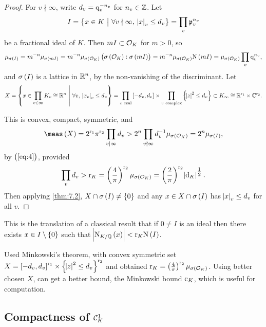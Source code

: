 \begin{proof}
For $ v \nmid \infty $, write $ d_v = \mathrm{q}_v^{-n_v} $ for $ n_v \in \mathbb{Z} $. Let
$$ I = \cbr{x \in K \st \forall v \nmid \infty, \ \abs{x}_v \le d_v} = \prod_v \ppp_v^{n_v} $$
be a fractional ideal of $ K $. Then $ mI \subset \mathcal{O}_K $ for $ m > 0 $, so
\begin{equation}
\label{eq:4}
\mu_{\sigma\br{I}} = m^{-n}\mu_{\sigma\br{mI}} = m^{-n}\mu_{\sigma\br{\OOO_K}}\br{\sigma\br{\OOO_K} : \sigma\br{mI}} = m^{-n}\mu_{\sigma\br{\OOO_K}}\N\br{mI} = \mu_{\sigma\br{\OOO_K}}\prod_v \q_v^{n_v},
\end{equation}
and $ \sigma\br{I} $ is a lattice in $ \mathbb{R}^n $, by the non-vanishing of the discriminant. Let
$$ X = \cbr{x \in \prod_{v \in \infty} K_v \cong \RR^n \st \forall v, \ \abs{x_v}_v \le d_v} = \prod_{v \ \text{real}} \sbr{-d_v, d_v} \times \prod_{v \ \text{complex}} \cbr{\abs{z}^2 \le d_v} \subset K_\infty \cong \RR^{\r_1} \times \CC^{\r_2}. $$

\pagebreak

This is convex, compact, symmetric, and
$$ \meas\br{X} = 2^{\r_1}\pi^{\r_2}\prod_{v \mid \infty} d_v > 2^n\prod_{v \nmid \infty} d_v^{-1}\mu_{\sigma\br{\OOO_K}} = 2^n\mu_{\sigma\br{I}}, $$
by $ \br{\ref{eq:4}} $, provided
$$ \prod_v d_v > \r_K = \br{\dfrac{4}{\pi}}^{\r_2}\mu_{\sigma\br{\OOO_K}} = \br{\dfrac{2}{\pi}}^{\r_2}\abs{\d_K}^{\tfrac{1}{2}}. $$
Then applying \ref{thm:7.2}, $ X \cap \sigma\br{I} \ne \cbr{0} $ and any $ x \in X \cap \sigma\br{I} $ has $ \abs{x}_v \le d_v $ for all $ v $.
\end{proof}

This is the translation of a classical result that if $ 0 \ne I $ is an ideal then there exists $ x \in I \setminus \cbr{0} $ such that $ \abs{\N_{K / \QQ}\br{x}} < \r_K\N\br{I} $.


\begin{remark*}
Used Minkowski's theorem, with convex symmetric set $ X = \sbr{-d_v, d_v}^{\r_1} \times \cbr{\abs{z}^2 \le d_v}^{\r_2} $ and obtained $ \r_K = \br{\tfrac{4}{\pi}}^{\r_2}\mu_{\sigma\br{\OOO_K}} $. Using better chosen $ X $, can get a better bound, the Minkowski bound $ \mathrm{c}_K $, which is useful for computation.
\end{remark*}

\subsection{Compactness of \texorpdfstring{$ \mathcal{C}_K^1 $}{norm one idele class group}}

